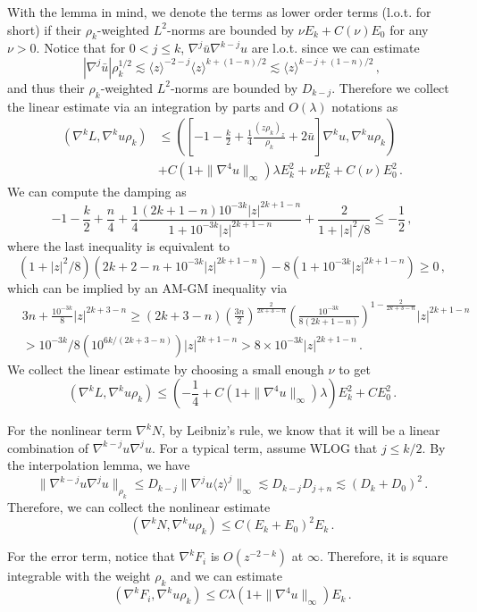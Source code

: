 \documentclass[12pt]{caltech_thesis}
\numberwithin{equation}{section}
\begin{document}
With the lemma in mind, we
denote the terms as lower order terms (l.o.t. for short) if their $\rho_k$-weighted $L^2$-norms are bounded by $\nu E_k+C(\nu)E_0$ for any $\nu>0$. Notice that for $0<j\leq k$, $\nabla^{j}\bar{u}\nabla^{k-j}u$ are l.o.t. since we can estimate $$|\nabla^{j}\bar{u}|\rho_k^{1/2}\lesssim\langle z\rangle^{-2-j}\langle z\rangle^{k+(1-n)/2}\lesssim\langle z\rangle^{k-j+(1-n)/2}\,,$$
and thus their $\rho_k$-weighted $L^2$-norms are bounded by $D_{k-j}$.
Therefore we collect the linear estimate via an integration by parts and $O(\lambda)$ notations as 
$$\begin{aligned}(\nabla^kL,\nabla^ku\rho_k)&\leq ([-1-\frac{k}{2}+\frac{1}{4}\frac{(z\rho_k)_z}{\rho_k}+2\bar{u}]\nabla^ku,\nabla^ku\rho_k)\\&+C(1+\|\nabla^4u\|_{\infty})\lambda E_k^2+\nu E_k^2+C(\nu)E_0^2\,.\end{aligned}$$ We can compute the damping as $$-1-\frac{k}{2}+\frac{n}{4}+\frac{1}{4}\frac{(2k+1-n)10^{-3k}|z|^{2k+1-n}}{1+10^{-3k}|z|^{2k+1-n}}+\frac{2}{1+|z|^2/8}\leq-\frac{1}{2} \,,$$
 where the last inequality is equivalent to $$(1+|z|^2/8)(2k+2-n+10^{-3k}|z|^{2k+1-n})-8(1+10^{-3k}|z|^{2k+1-n})\geq0\,,$$ which can be implied by an AM-GM inequality via $$\begin{aligned}
     &3n+\frac{10^{-3k}}{8}|z|^{2k+3-n}\geq(2k+3-n)(\frac{3n}{2})^{\frac{2}{2k+3-n}}(\frac{10^{-3k}}{8(2k+1-n)})^{1-\frac{2}{2k+3-n}}|z|^{2k+1-n}\\&>10^{-3k}/8(10^{6k/(2k+3-n)})|z|^{2k+1-n}>8\times10^{-3k}|z|^{2k+1-n}\,.
 \end{aligned}$$
We collect the linear estimate by choosing a small enough $\nu$ to get
\begin{equation*}
(\nabla^kL,\nabla^ku\rho_k)\leq (-\frac{1}{4}+C(1+\|\nabla^4u\|_{\infty})\lambda)E_k^2+CE_0^2\,.
\end{equation*}

For the nonlinear term $\nabla^kN$, by Leibniz's rule, we know that it will be a linear combination of $\nabla^{k-j}u\nabla^{j}u$. For a typical term, assume WLOG that $j\leq k/2$. By the interpolation lemma, we have 
$$\|\nabla^{k-j}u\nabla^{j}u\|_{\rho_k}\leq D_{k-j}\|\nabla^ju\langle z\rangle^j\|_{\infty}\lesssim D_{k-j}D_{j+n}\lesssim(D_k+D_0)^2\,.$$
Therefore, we can collect the nonlinear estimate 
\begin{equation*}
(\nabla^kN,\nabla^ku\rho_k)\leq C(E_k+E_0)^2 E_k\,.
\end{equation*}

For the error term, notice that $\nabla^kF_i$ is  $O(z^{-2-k})$ at $\infty$. Therefore, it is square integrable with the weight $\rho_k$ and we can estimate  \begin{equation*}
(\nabla^kF_i,\nabla^ku\rho_k)\leq C\lambda(1+\|\nabla^4u\|_{\infty}) E_k\,.
\end{equation*}
\end{document}

